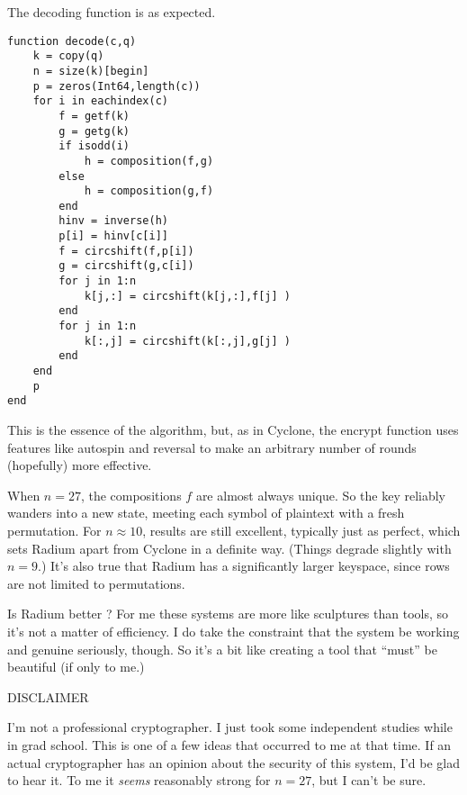 \documentclass{article}
\renewcommand{\i}{\textit}
\newcommand{\q}{\enquote}
\begin{document}
{{The decoding function is as expected.

\begin{verbatim}
function decode(c,q)
    k = copy(q)
    n = size(k)[begin]
    p = zeros(Int64,length(c))
    for i in eachindex(c)
        f = getf(k)
        g = getg(k)
        if isodd(i)
            h = composition(f,g)
        else
            h = composition(g,f)        
        end
        hinv = inverse(h)
        p[i] = hinv[c[i]]
        f = circshift(f,p[i])
        g = circshift(g,c[i])
        for j in 1:n
            k[j,:] = circshift(k[j,:],f[j] )
        end
        for j in 1:n
            k[:,j] = circshift(k[:,j],g[j] )
        end 
    end
    p
end
\end{verbatim}



This is the essence of the algorithm, but, as in Cyclone, the encrypt function uses features like autospin and reversal to make an arbitrary number of rounds (hopefully) more effective. 

When $n = 27$, the compositions $f$ are almost always unique. So the key reliably wanders into a new state, meeting each symbol of plaintext with a fresh permutation. For $n \approx 10$, results are still excellent, typically just as perfect, which sets Radium apart from Cyclone in a definite way. (Things degrade slightly with $n = 9$.) It's also true that Radium has a significantly larger keyspace, since rows are not limited to permutations. 

Is Radium better ? For me these systems are more like sculptures than tools, so it's not a matter of efficiency. I do take the  constraint that the system be working and genuine seriously, though. So it's a bit like creating a tool that \q{must} be beautiful (if only to me.)


DISCLAIMER

I'm not a professional cryptographer. I just took some independent studies while in grad school. This is one of a few ideas that occurred to me at that time. If an actual cryptographer has an opinion about the security of this system, I'd be glad to hear it. To me it \i{seems} reasonably strong for $n = 27$, but I can't be sure. 

}}
\end{document}
